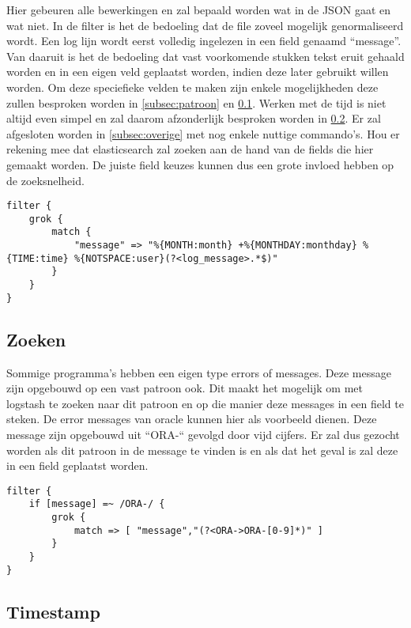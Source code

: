 Hier gebeuren alle bewerkingen en zal bepaald worden wat in de JSON gaat en wat niet. In de filter is het de bedoeling dat de file zoveel mogelijk genormaliseerd wordt. Een log lijn wordt eerst volledig ingelezen in een field  genaamd “message”. Van daaruit is het de bedoeling dat vast voorkomende stukken tekst eruit gehaald worden en in een eigen veld geplaatst worden, indien deze later gebruikt willen worden.  Om deze speciefieke velden te maken zijn enkele mogelijkheden deze zullen besproken worden in \hyperref[subsec:patroon]{\ref{subsec:patroon}} en \hyperref[subsec:zoeken]{\ref{subsec:zoeken}}. Werken met de tijd is niet altijd even simpel en zal daarom afzonderlijk besproken worden in \hyperref[subsec:timestamp]{\ref{subsec:timestamp}}. Er zal afgesloten worden in \hyperref[subsec:overige]{\ref{subsec:overige}} met nog enkele nuttige commando’s. 
Hou er rekening mee dat elasticsearch zal zoeken aan de hand van de fields die hier gemaakt worden. De juiste field keuzes kunnen dus een grote invloed hebben op de zoeksnelheid.

\lstset{escapechar=@,style=customc}  
\begin{lstlisting}[frame=single]  
filter {
	grok {
		match {
			"message" => "%{MONTH:month} +%{MONTHDAY:monthday} %{TIME:time} %{NOTSPACE:user}(?<log_message>.*$)"	 
		}
	}
}
\end{lstlisting}

\subsection{Zoeken}
\label{subsec:zoeken}

Sommige programma’s hebben een eigen type errors of messages. Deze message zijn opgebouwd op een vast patroon ook. Dit maakt het mogelijk om met logstash te zoeken naar dit patroon en op die manier deze messages in een field te steken. De error messages van oracle kunnen hier als voorbeeld dienen. Deze message zijn opgebouwd uit “ORA-“ gevolgd door vijd cijfers. Er zal dus gezocht worden als dit patroon in de message te vinden is en als dat het geval is zal deze in een field geplaatst worden.

\lstset{escapechar=@,style=customc}  
\begin{lstlisting}[frame=single]  
filter {
	if [message] =~ /ORA-/ {
		grok {
			match => [ "message","(?<ORA->ORA-[0-9]*)" ]
		}  
	}
}
\end{lstlisting}

\subsection{Timestamp}
\label{subsec:timestamp}

